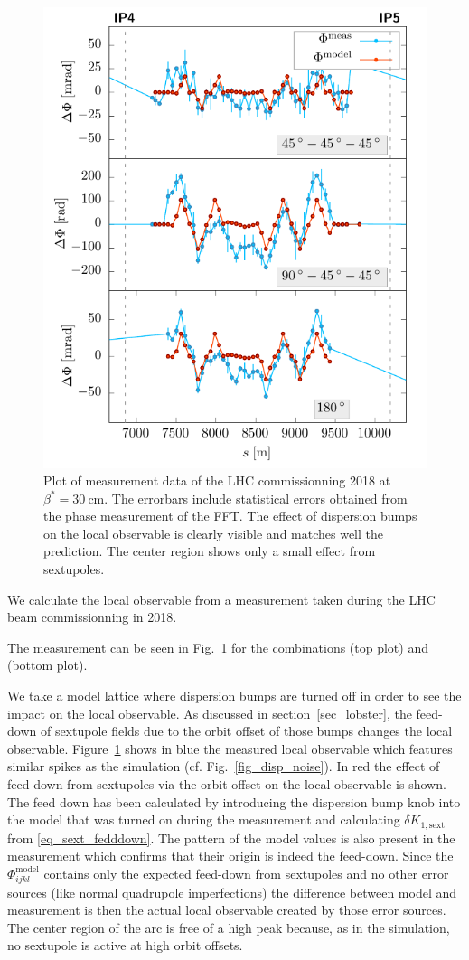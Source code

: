 \begin{figure}[t]
  \centering
  \includegraphics[width=.7\linewidth]{meas}
  \caption{Plot of measurement data of the LHC commissionning 2018 at $\beta^*=\SI{30}{\centi\metre}$.
    The errorbars include statistical errors
    obtained from the phase measurement of the FFT.
    The effect of dispersion bumps on the local observable is clearly visible and matches well the
    prediction. The center region shows only a small effect from sextupoles.
  }
  \label{fig_measlobster002}
\end{figure}
%
We calculate the local observable from a measurement taken during the LHC beam commissionning in 2018.

The measurement can be seen in Fig.~\ref{fig_measlobster002} for the combinations 
(top plot) and  (bottom plot).

We take a model lattice where dispersion bumps are turned off in order to see the impact on the 
local observable.
As discussed in section~\ref{sec_lobster}, the feed-down of sextupole fields due to the orbit offset
of those bumps changes the local observable.
Figure~\ref{fig_measlobster002} shows in blue the measured local observable which features similar
spikes as the simulation (cf. Fig.~\ref{fig_disp_noise}).
In red the effect of feed-down from sextupoles via the orbit offset on the local observable is shown.
The feed down has been calculated by introducing the dispersion bump knob into the model that was turned
on during the measurement and calculating $\delta K_{1, \text{sext}}$ from \eqref{eq_sext_fedddown}.
The pattern of the model
values is also present in the measurement which confirms that their origin is indeed the feed-down.
Since the $\Phi_{ijkl}^\text{model}$ contains only the expected feed-down from sextupoles and no other
error sources (like normal quadrupole imperfections) the difference between model and measurement is
then the actual local observable created by those error sources.
The center region of the arc is free of a high peak because, as in the simulation, no sextupole is 
active at high orbit offsets.


